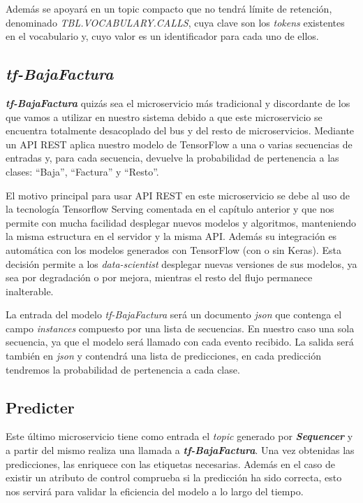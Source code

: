 Además se apoyará en un topic compacto que no tendrá  límite de retención, denominado \newline \textit{TBL.VOCABULARY.CALLS}, cuya clave son los \textit{tokens} existentes en el vocabulario y,  cuyo  valor es un identificador para cada uno de ellos.

\subsection{\textit{tf-BajaFactura}}
\textit{\textbf{tf-BajaFactura}} quizás sea el microservicio más tradicional y discordante de los que vamos a utilizar en nuestro sistema debido a que este microservicio se encuentra totalmente desacoplado del bus y del resto de microservicios. Mediante un API REST aplica nuestro modelo de TensorFlow a una o varias secuencias de entradas y, para cada secuencia, devuelve la probabilidad de pertenencia a las clases: ``Baja'', ``Factura'' y ``Resto''.

El motivo principal para usar API REST en este microservicio se debe al uso de la tecnología  Tensorflow Serving comentada en el capítulo anterior y que nos permite con mucha facilidad desplegar nuevos modelos y algoritmos, manteniendo la misma estructura en el servidor y la misma API. Además su integración es automática con los modelos generados con TensorFlow (con o sin Keras). Esta decisión permite a los \textit{data-scientist} desplegar nuevas versiones de sus modelos, ya sea por degradación o por mejora, mientras el resto del flujo permanece inalterable. 

La entrada del modelo \textit{tf-BajaFactura} será un documento \textit{json} que contenga el campo \textit{instances} compuesto por una lista de secuencias. En nuestro caso una sola secuencia, ya que el modelo será llamado con cada evento recibido. La salida será también en \textit{json} y contendrá una lista de predicciones, en cada predicción tendremos la probabilidad de pertenencia a cada clase.




\subsection{Predicter}
Este último microservicio tiene como entrada el \textit{topic} generado por \textit{\textbf{Sequencer}} y a partir del mismo realiza una llamada a \textit{\textbf{tf-BajaFactura}}. Una vez obtenidas las predicciones, las enriquece con las etiquetas necesarias. Además en el caso de existir un atributo de control comprueba si la predicción ha sido correcta, esto nos servirá para validar la eficiencia del modelo a lo largo del tiempo. 

